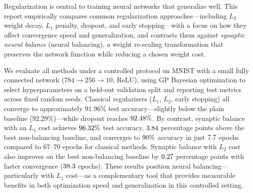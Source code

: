 Regularization is central to training neural networks that generalize well. This report empirically compares common regularization approaches---including $L_2$ weight decay, $L_1$ penalty, dropout, and early stopping---with a focus on how they affect convergence speed and generalization, and contrasts them against \emph{synaptic neural balance} (neural balancing), a weight re-scaling transformation that preserves the network function while reducing a chosen weight cost.

We evaluate all methods under a controlled protocol on MNIST with a small fully connected network ($784 \to 256 \to 10$, ReLU), using GP Bayesian optimization to select hyperparameters on a held-out validation split and reporting test metrics across \NumSeeds{} fixed random seeds. Classical regularizers ($L_1$, $L_2$, early stopping) all converge to approximately $91.96\%$ test accuracy---slightly below the plain baseline ($92.29\%$)---while dropout reaches $92.48\%$. By contrast, synaptic balance with an $L_1$ cost achieves $96.32\%$ test accuracy, $3.84$ percentage points above the best non-balancing baseline, and converges to $90\%$ accuracy in just $7.7$ epochs compared to $67$--$70$ epochs for classical methods. Synaptic balance with $L_2$ cost also improves on the best non-balancing baseline by $0.27$ percentage points with faster convergence ($38.3$ epochs). These results position neural balancing---particularly with $L_1$ cost---as a complementary tool that provides measurable benefits in both optimization speed and generalization in this controlled setting.